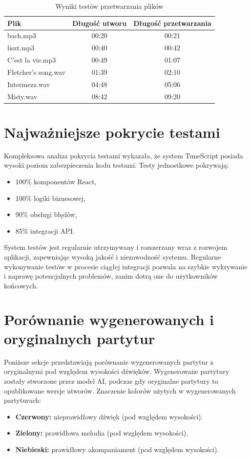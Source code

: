 \documentclass[a4paper,twoside,12pt]{book}
\begin{document}
\begin{table}[ht]
\centering
\caption{Wyniki testów przetwarzania plików}
\label{tab:wyniki_testow}
\begin{tabular}{|l|c|c|}
\hline
\textbf{Plik} & \textbf{Długość utworu} & \textbf{Długość przetwarzania} \\
\hline
bach.mp3 & 00:20 & 00:21 \\
\hline
liszt.mp3 & 00:40 & 00:42 \\
\hline
C'est la vie.mp3 & 00:49 & 01:07 \\
\hline
Fletcher's song.wav & 01:39 & 02:10 \\
\hline
Intermezz.wav & 04:48 & 05:06 \\
\hline
Misty.wav & 08:42 & 09:20 \\
\hline
\end{tabular}
\end{table}



\section{Najważniejsze pokrycie testami}
Kompleksowa analiza pokrycia testami wykazała, że system TuneScript posiada wysoki poziom zabezpieczenia kodu testami. Testy jednostkowe pokrywają:
\begin{itemize}
  \item 100\% komponentów React,
  \item 100\% logiki biznesowej,
  \item 90\% obsługi błędów,
  \item 85\% integracji API.
\end{itemize}

System testów jest regularnie utrzymywany i rozszerzany wraz z rozwojem aplikacji, zapewniając wysoką jakość i niezawodność systemu. Regularne wykonywanie testów w procesie ciągłej integracji pozwala na szybkie wykrywanie i naprawę potencjalnych problemów, zanim dotrą one do użytkowników końcowych.

\section{Porównanie wygenerowanych i oryginalnych partytur}
Poniższe sekcje przedstawiają porównanie wygenerowanych partytur z oryginalnymi pod względem wysokości dźwięków. Wygenerowane partytury zostały stworzone przez model AI, podczas gdy oryginalne partytury to opublikowane wersje utworów. Znaczenie kolorów użytych w wygenerowanych partyturach:
\begin{itemize}
    \item \textbf{Czerwony:} nieprawidłowy dźwięk (pod względem wysokości).
    \item \textbf{Zielony:} prawidłowa melodia (pod względem wysokości).
    \item \textbf{Niebieski:} prawidłowy akompaniament (pod względem wysokości).
\end{itemize}
\end{document}
